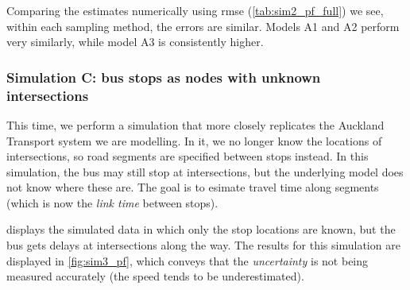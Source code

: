 Comparing the estimates numerically using \gls{rmse} (\cref{tab:sim2_pf_full}) we see, within each sampling method, the errors are similar. Models A1 and A2 perform very similarly, while model A3 is consistently higher.



\subsubsection{Simulation C: bus stops as nodes with unknown intersections}
\label{sec:vehicle_sim_C}

This time, we perform a simulation that more closely replicates the Auckland Transport system we are modelling. In it, we no longer know the locations of intersections, so road segments are specified between stops instead. In this simulation, the bus may still stop at intersections, but the underlying model does not know where these are. The goal is to esimate travel time along segments (which is now the \emph{link time} between stops).




 displays the simulated data in which only the stop locations are known, but the bus gets delays at intersections along the way. The results for this simulation are displayed in \cref{fig:sim3_pf}, which conveys that the \emph{uncertainty} is not being measured accurately (the speed tends to be underestimated).

